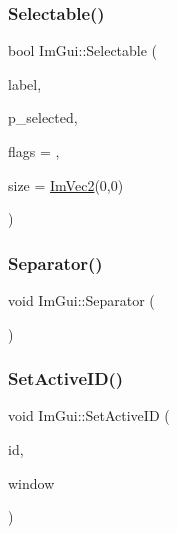 \subsubsection{\texorpdfstring{Selectable()}{Selectable()}\hspace{0.1cm}{\footnotesize\ttfamily [2/2]}}
{\footnotesize\ttfamily bool Im\+Gui\+::\+Selectable (\begin{DoxyParamCaption}\item[{const char $\ast$}]{label,  }\item[{bool $\ast$}]{p\+\_\+selected,  }\item[{Im\+Gui\+Selectable\+Flags}]{flags = {},  }\item[{const \hyperlink{struct_im_vec2}{Im\+Vec2} \&}]{size = {\ttfamily \hyperlink{struct_im_vec2}{Im\+Vec2}(0,0)} }\end{DoxyParamCaption})}

\hypertarget{namespace_im_gui_a191123597a5084d003c8beac7eeb029e}{}\label{namespace_im_gui_a191123597a5084d003c8beac7eeb029e} 
\subsubsection{\texorpdfstring{Separator()}{Separator()}}
{\footnotesize\ttfamily void Im\+Gui\+::\+Separator (\begin{DoxyParamCaption}{ }\end{DoxyParamCaption})}

\hypertarget{namespace_im_gui_a27b8ace13a8c421ee8405f0cbebe4ead}{}\label{namespace_im_gui_a27b8ace13a8c421ee8405f0cbebe4ead} 
\subsubsection{\texorpdfstring{Set\+Active\+I\+D()}{SetActiveID()}}
{\footnotesize\ttfamily void Im\+Gui\+::\+Set\+Active\+ID (\begin{DoxyParamCaption}\item[{Im\+Gui\+ID}]{id,  }\item[{\hyperlink{struct_im_gui_window}{Im\+Gui\+Window} $\ast$}]{window }\end{DoxyParamCaption})}

\hypertarget{namespace_im_gui_aa4824a1b351c063b4aff9b9f4fb5fd4d}{}\label{namespace_im_gui_aa4824a1b351c063b4aff9b9f4fb5fd4d} 

